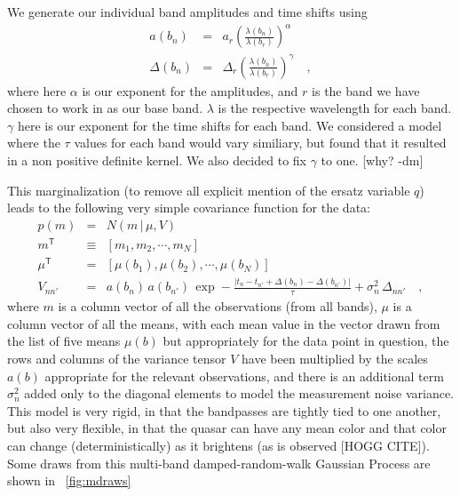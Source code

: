 \documentclass[letterpaper,12pt,preprint]{aastex}
\newcommand{\given}{\,|\,}
\newcommand{\transpose}[1]{{#1}^{\mathsf{T}}}
\begin{document}
We generate our individual band amplitudes and time shifts using
\begin{eqnarray}
a(b_n) &=& a_r(\frac{\lambda(b_n)}{\lambda(b_r)})^\alpha
\\
\Delta(b_n) &=& \Delta_r(\frac{\lambda(b_n)}{\lambda(b_r)})^\gamma
\quad ,
\end{eqnarray}
where here $\alpha$ is our exponent for the amplitudes, and $r$ is the band we have chosen to work in as our base band. $\lambda$ is the respective wavelength for each band. $\gamma$ here is our exponent for the time shifts for each band. We considered a model where the $\tau$ values for each band would vary similiary, but found that it resulted in a non positive definite kernel. We also decided to fix $\gamma$ to one. [why? -dm]

This marginalization (to remove all explicit mention of the ersatz
variable $q$) leads to the following very simple covariance function
for the data:
\begin{eqnarray}
p(m) &=& N(m\given \mu,V)
\label{eq:likestart}
\\
\transpose{m} &\equiv& [m_1, m_2, \cdots , m_N]
\\
\transpose{\mu} &=& [\mu(b_1), \mu(b_2), \cdots , \mu(b_N)]
\\
V_{nn'} &=& a(b_n)\,a(b_{n'})\,\exp -\frac{|t_n - t_{n'}+\Delta(b_n) - \Delta(b_{n'})|}{\tau} + \sigma_n^2\,\Delta_{nn'}
\label{eq:likeend}
\quad ,
\end{eqnarray}
where $m$ is a column vector of all the observations (from all bands),
$\mu$ is a column vector of all the means, with each mean value in the
vector drawn from the list of five means $\mu(b)$ but appropriately
for the data point in question, the rows and columns of the variance
tensor $V$ have been multiplied by the scales $a(b)$ appropriate for
the relevant observations, and there is an additional term
$\sigma_n^2$ added only to the diagonal elements to model the
measurement noise variance.  This model is very rigid, in that the
bandpasses are tightly tied to one another, but also very flexible, in
that the quasar can have any mean color and that color can change
(deterministically) as it brightens (as is observed [HOGG CITE]).
Some draws from this multi-band damped-random-walk Gaussian Process
are shown in \figurename~\ref{fig:mdraws}
\end{document}
